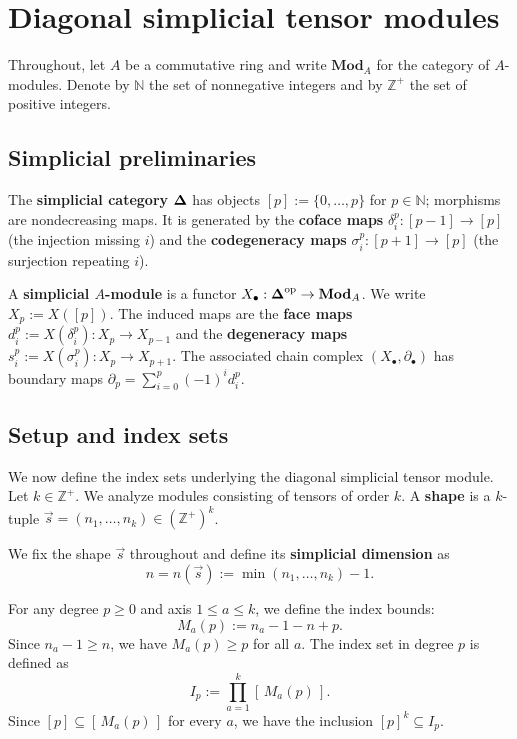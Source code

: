 \section{Diagonal simplicial tensor modules}
\label{sec:dstm}

Throughout, let $A$ be a commutative ring and write $\mathbf{Mod}_A$ for the category of $A$-modules.
Denote by $\mathbb{N}$ the set of nonnegative integers and by $\mathbb{Z}^+$ the set of positive integers.

\subsection{Simplicial preliminaries}

The \textbf{simplicial category} $\boldsymbol{\Delta}$ has objects $[p]:=\{0,\ldots,p\}$ for $p\in\mathbb{N}$; morphisms are nondecreasing maps.
It is generated by the \textbf{coface maps} $\delta_i^p:[p-1]\to[p]$ (the injection missing $i$) and the \textbf{codegeneracy maps} $\sigma_i^p:[p+1]\to[p]$ (the surjection repeating $i$).

A \textbf{simplicial $A$-module} is a functor $X_\bullet:\boldsymbol{\Delta}^{\mathrm{op}}\to\mathbf{Mod}_A$.
We write $X_p:=X([p])$. The induced maps are the \textbf{face maps} $d_i^p:=X(\delta_i^p):X_p\to X_{p-1}$ and the \textbf{degeneracy maps} $s_i^p:=X(\sigma_i^p):X_p\to X_{p+1}$.
The associated chain complex $(X_\bullet, \partial_\bullet)$ has boundary maps $\partial_p = \sum_{i=0}^p (-1)^i d_i^p$.

\subsection{Setup and index sets}

We now define the index sets underlying the diagonal simplicial tensor module.
Let $k\in\mathbb{Z}^+$. We analyze modules consisting of tensors of order $k$.
A \textbf{shape} is a $k$-tuple $\vec{s}=(n_1,\dots,n_k)\in(\mathbb{Z}^+)^k$.

We fix the shape $\vec{s}$ throughout and define its \textbf{simplicial dimension} as
\[
n=n(\vec{s}):=\min(n_1,\dots,n_k)-1.
\]

For any degree $p\ge 0$ and axis $1\le a\le k$, we define the index bounds:
\[
M_a(p):=n_a-1-n+p.
\]
Since $n_a-1 \ge n$, we have $M_a(p)\ge p$ for all $a$. The index set in degree $p$ is defined as
\[
I_p:=\prod_{a=1}^k [\,M_a(p)\,].
\]
Since $[p]\subseteq[\,M_a(p)\,]$ for every $a$, we have the inclusion $[p]^k\subseteq I_p$.


